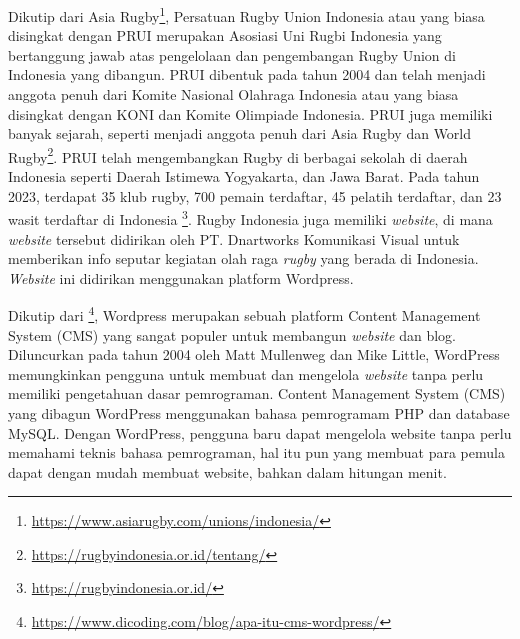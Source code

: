 Dikutip dari Asia Rugby\footnote{\url{https://www.asiarugby.com/unions/indonesia/}}, Persatuan Rugby Union Indonesia atau yang biasa disingkat dengan PRUI merupakan Asosiasi Uni Rugbi Indonesia yang bertanggung jawab atas pengelolaan dan pengembangan Rugby Union di Indonesia yang dibangun. PRUI dibentuk pada tahun 2004 dan telah menjadi anggota penuh dari Komite Nasional Olahraga Indonesia atau yang biasa disingkat dengan KONI dan Komite Olimpiade Indonesia. PRUI juga memiliki banyak sejarah, seperti menjadi anggota penuh dari Asia Rugby dan World Rugby\footnote{\url{https://rugbyindonesia.or.id/tentang/}}. PRUI telah mengembangkan Rugby di berbagai sekolah di daerah Indonesia seperti Daerah Istimewa Yogyakarta, dan Jawa Barat. Pada tahun 2023, terdapat 35 klub rugby, 700 pemain terdaftar, 45 pelatih terdaftar, dan 23 wasit terdaftar di Indonesia \footnote{\url{https://rugbyindonesia.or.id/}}. Rugby Indonesia juga memiliki \textit{website}, di mana \textit{website} tersebut didirikan oleh PT. Dnartworks Komunikasi Visual untuk memberikan info seputar kegiatan olah raga \textit{rugby} yang berada di Indonesia. \textit{Website} ini didirikan menggunakan platform Wordpress.

Dikutip dari \footnote{\url{https://www.dicoding.com/blog/apa-itu-cms-wordpress/}}, Wordpress merupakan sebuah platform Content Management System (CMS) yang sangat populer untuk membangun \textit{website} dan blog. Diluncurkan pada tahun 2004 oleh Matt Mullenweg dan Mike Little, WordPress memungkinkan pengguna untuk membuat dan mengelola \textit{website} tanpa perlu memiliki pengetahuan dasar pemrograman. Content Management System (CMS) yang dibagun WordPress menggunakan bahasa pemrogramam PHP dan database MySQL. Dengan WordPress, pengguna baru dapat mengelola website tanpa perlu memahami teknis bahasa pemrograman, hal itu pun yang membuat para pemula dapat dengan mudah membuat website, bahkan dalam hitungan menit.

